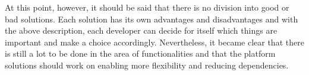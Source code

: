     At this point, however, it should be said that there is no division into good or bad solutions. Each solution has its own advantages and disadvantages and with the above description, each developer can decide for itself which things are important and make a choice accordingly. Nevertheless, it became clear that there is still a lot to be done in the area of functionalities and that the platform solutions should work on enabling more flexibility and reducing dependencies. 
	
	
	
	